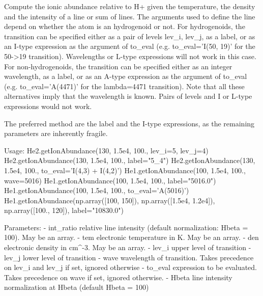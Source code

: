 \begin{DoxyVerb}Compute the ionic abundance relative to H+ given the temperature, the density and the 
    intensity of a line or sum of lines.
The arguments used to define the line depend on whether the atom is an hydrogenoid or not. 
For hydrogenoids, the transition can be specified either as a pair of levels 
    lev_i, lev_j, as a label, or as an I-type expression as the argument of to_eval 
    (e.g. to_eval='I(50, 19)' for the 50->19 transition). Wavelengths or L-type expressions 
    will not work in this case. 
For non-hydrogenoids, the transition can be specified either as an integer wavelength, 
    as a label, or as an A-type expression as the argument of to_eval (e.g. to_eval='A(4471)' 
    for the lambda=4471 transition). Note that all these alternatives imply that the wavelength
    is known. Pairs of levels and I or L-type expressions would not work.

The preferred method are the label and the I-type expressions, as the remaining parameters 
    are inherently fragile.

Usage:
    He2.getIonAbundance(130, 1.5e4, 100., lev_i=5, lev_j=4)
    He2.getIonAbundance(130, 1.5e4, 100., label="5_4")
    He2.getIonAbundance(130, 1.5e4, 100., to_eval='I(4,3) + I(4,2)')
    He1.getIonAbundance(100, 1.5e4, 100., wave=5016)
    He1.getIonAbundance(100, 1.5e4, 100., label="5016.0")
    He1.getIonAbundance(100, 1.5e4, 100., to_eval='A(5016)')
    He1.getIonAbundance(np.array([100, 150]), np.array([1.5e4, 1.2e4]), np.array([100., 120]), 
label="10830.0")
    
Parameters:
    - int_ratio    relative line intensity (default normalization: Hbeta = 100). 
            May be an array.
    - tem          electronic temperature in K. May be an array.
    - den          electronic density in cm^-3. May be an array.
    - lev_i        upper level of transition
    - lev_j        lower level of transition
    - wave         wavelength of transition. Takes precedence on lev_i and lev_j if set, 
            ignored otherwise 
    - to_eval      expression to be evaluated. Takes precedence on wave if set, 
            ignored otherwise.
    - Hbeta        line intensity normalization at Hbeta (default Hbeta = 100)\end{DoxyVerb}
